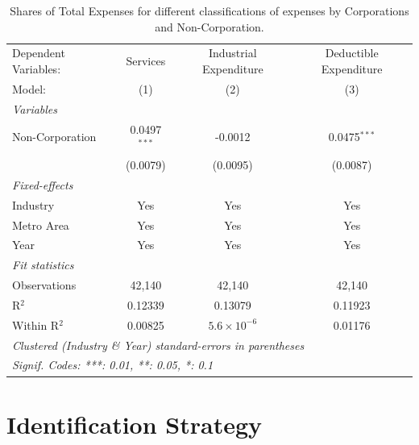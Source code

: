 \documentclass[
  12pt]{article}
\theoremstyle{definition}
\theoremstyle{remark}
\begin{document}
\begin{table}

\caption{\label{tbl-reg-shares-3}Shares of Total Expenses for different
classifications of expenses by Corporations and Non-Corporation.}

\begin{minipage}{\linewidth}

\begingroup
\centering
\begin{tabular}{lccc}
   \tabularnewline \midrule \midrule
   Dependent Variables: & Services       & Industrial Expenditure & Deductible Expenditure\\  
   Model:               & (1)            & (2)                    & (3)\\  
   \midrule
   \emph{Variables}\\
   Non-Corporation      & 0.0497$^{***}$ & -0.0012                & 0.0475$^{***}$\\   
                        & (0.0079)       & (0.0095)               & (0.0087)\\   
   \midrule
   \emph{Fixed-effects}\\
   Industry             & Yes            & Yes                    & Yes\\  
   Metro Area           & Yes            & Yes                    & Yes\\  
   Year                 & Yes            & Yes                    & Yes\\  
   \midrule
   \emph{Fit statistics}\\
   Observations         & 42,140         & 42,140                 & 42,140\\  
   R$^2$                & 0.12339        & 0.13079                & 0.11923\\  
   Within R$^2$         & 0.00825        & $5.6\times 10^{-6}$    & 0.01176\\  
   \midrule \midrule
   \multicolumn{4}{l}{\emph{Clustered (Industry \& Year) standard-errors in parentheses}}\\
   \multicolumn{4}{l}{\emph{Signif. Codes: ***: 0.01, **: 0.05, *: 0.1}}\\
\end{tabular}
\par\endgroup

\end{minipage}%

\end{table}%

\section{Identification Strategy}\label{sec-id-strat}
\end{document}
